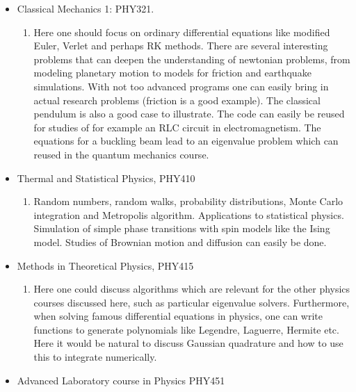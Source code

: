 \documentclass[%
oneside,                 %
final,                   %
10pt]{article}
\begin{document}
\begin{itemize}
 \item Classical Mechanics 1: PHY321. 
\begin{enumerate}

  \item Here one should focus on ordinary differential equations like modified Euler, Verlet and perhaps RK methods. There are several interesting problems that can deepen the understanding of newtonian problems, from modeling planetary motion to models for friction and earthquake simulations. With not too advanced programs one can easily bring in actual research problems (friction is a good example).  The classical pendulum is also a good case to illustrate. The code can easily be reused for studies of for example an RLC circuit in electromagnetism. The equations for a buckling beam lead to an eigenvalue problem which can reused in the quantum mechanics course.

\end{enumerate}

\noindent
 \item Thermal and Statistical Physics, PHY410
\begin{enumerate}

  \item Random numbers, random walks, probability distributions, Monte Carlo integration and Metropolis algorithm. Applications to statistical physics. Simulation of simple phase transitions with spin models like the Ising model.  Studies of Brownian motion and diffusion can easily be done.

\end{enumerate}

\noindent
 \item Methods in Theoretical Physics, PHY415
\begin{enumerate}

  \item Here one could discuss algorithms which are relevant for the other physics courses discussed here, such as particular eigenvalue solvers. Furthermore, when solving famous differential equations in physics, one can write functions to generate polynomials like Legendre, Laguerre, Hermite etc. Here it would be natural to discuss Gaussian quadrature and how to use this to integrate numerically. 

\end{enumerate}

\noindent
 \item Advanced Laboratory course in Physics PHY451
\begin{enumerate}


\end{enumerate}
\end{itemize}
\end{document}
